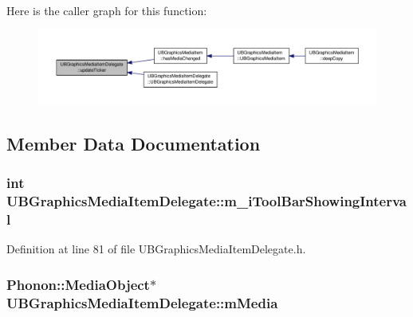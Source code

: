 Here is the caller graph for this function\-:
\nopagebreak
\begin{figure}[H]
\begin{center}
\leavevmode
\includegraphics[width=350pt]{df/dfb/class_u_b_graphics_media_item_delegate_a302ad976f1306f959d838371cd441dc9_icgraph}
\end{center}
\end{figure}




\subsection{Member Data Documentation}
\hypertarget{class_u_b_graphics_media_item_delegate_a3100e67e3ea0de481796fe948317da6e}{
\subsubsection[{m\-\_\-i\-Tool\-Bar\-Showing\-Interval}]{\setlength{\rightskip}{0pt plus 5cm}int U\-B\-Graphics\-Media\-Item\-Delegate\-::m\-\_\-i\-Tool\-Bar\-Showing\-Interval\hspace{0.3cm}{\ttfamily [protected]}}}\label{df/dfb/class_u_b_graphics_media_item_delegate_a3100e67e3ea0de481796fe948317da6e}


Definition at line 81 of file U\-B\-Graphics\-Media\-Item\-Delegate.\-h.

\hypertarget{class_u_b_graphics_media_item_delegate_ae6c2550cd7836da9af6f1250248e819b}{
\subsubsection[{m\-Media}]{\setlength{\rightskip}{0pt plus 5cm}Phonon\-::\-Media\-Object$\ast$ U\-B\-Graphics\-Media\-Item\-Delegate\-::m\-Media\hspace{0.3cm}{\ttfamily [protected]}}}\label{df/dfb/class_u_b_graphics_media_item_delegate_ae6c2550cd7836da9af6f1250248e819b}


